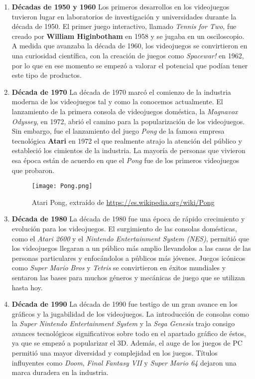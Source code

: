 \begin{enumerate}
    \item \textbf{Décadas de 1950 y 1960} Los primeros desarrollos en los videojuegos tuvieron lugar en laboratorios de investigación y universidades durante la década de 1950. El primer juego interactivo, llamado \textit{Tennis for Two}, fue creado por \textbf{William Higinbotham} en 1958 y se jugaba en un osciloscopio. A medida que avanzaba la década de 1960, los videojuegos se convirtieron en una curiosidad científica, con la creación de juegos como \textit{Spacewar!} en 1962, por lo que en ese momento se empezó a valorar el potencial que podían tener este tipo de productos.
    \item \textbf{Década de 1970} La década de 1970 marcó el comienzo de la industria moderna de los videojuegos tal y como la conocemos actualmente. El lanzamiento de la primera consola de videojuegos doméstica, la \textit{Magnavox Odyssey}, en 1972, abrió el camino para la popularización de los videojuegos. Sin embargo, fue el lanzamiento del juego \textit{Pong} de la famosa empresa tecnológica \textbf{Atari} en 1972 el que realmente atrajo la atención del público y estableció los cimientos de la industria. La mayoría de personas que vivieron esa época están de acuerdo en que el \textit{Pong} fue de los primeros videojuegos que probaron.
    \begin{figure}[H]
        \centering
        \texttt{[image: Pong.png]}
        \caption{Atari Pong, extraído de \url{https://es.wikipedia.org/wiki/Pong}}
    \end{figure}
    \item \textbf{Década de 1980} La década de 1980 fue una época de rápido crecimiento y evolución para los videojuegos. El surgimiento de las consolas domésticas, como el \textit{Atari 2600} y el \textit{Nintendo Entertainment System (NES)}, permitió que los videojuegos llegaran a un público más amplio llevandolos a las casas de las personas particulares y enfocándolos a públicos más jóvenes. Juegos icónicos como \textit{Super Mario Bros} y \textit{Tetris} se convirtieron en éxitos mundiales y sentaron las bases para muchos géneros y mecánicas de juego que se utilizan hasta hoy.
    \item \textbf{Década de 1990} La década de 1990 fue testigo de un gran avance en los gráficos y la jugabilidad de los videojuegos. La introducción de consolas como la \textit{Super Nintendo Entertainment System} y la \textit{Sega Genesis} trajo consigo avances tecnológicos significativos sobre todo en el apartado gráfico de éstos, ya que se empezó a popularizar el 3D. Además, el auge de los juegos de PC permitió una mayor diversidad y complejidad en los juegos. Títulos influyentes como \textit{Doom}, \textit{Final Fantasy VII} y \textit{Super Mario 64} dejaron una marca duradera en la industria.

\end{enumerate}
